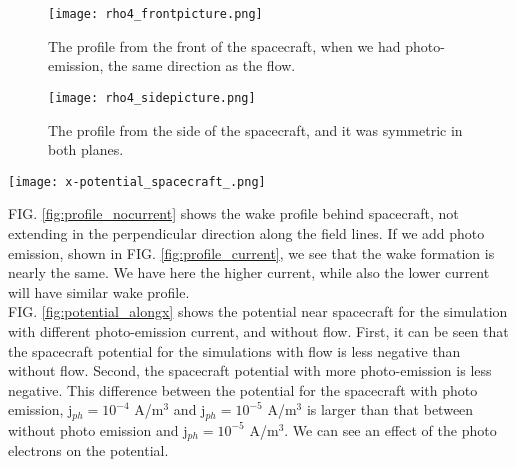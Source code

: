 \documentclass[aip, 
rsi, 
amsmath,
amssymb,
longbibliography,
reprint]{revtex4-1}
\begin{document}
\begin{figure*}
\begin{subfigure}{0.45\textwidth}\texttt{[image: rho4\_frontpicture.png]}
\caption{The profile from the front of the spacecraft, when we had photo-emission, the same direction as the flow.}
\end{subfigure}
\begin{subfigure}{0.45\textwidth}
\texttt{[image: rho4\_sidepicture.png]}
\caption{The profile from the side of the spacecraft, and it was symmetric in both planes.}
\end{subfigure}
\caption{The electron density(the phoe notation is used) distribution pictures: the situation when there is photo-emission of the j$_{ph} = 10^{-5}$ A/m$^3$ value. The wake is similar to the one in FIG. The gradient here is the density of electrons. \ref{fig:profile_nocurrent}. \label{fig:profile_current}}
\end{figure*}

\begin{figure*}
\texttt{[image: x-potential\_spacecraft\_.png]}
\caption{The potential along the flow direction for different photo emissions, emitting directly to the wake. Top line is the simulation with the photo-emission current set to $j_{ph} = 10^{-4}$ A/m$^3$, then to $10^{-5}$ A/m$^3$ and without photo emission. We also added the potential for the situation with no plasma flow, seen in the bottom.
\label{fig:potential_alongx}}
\end{figure*}

FIG. \ref{fig:profile_nocurrent} shows the wake profile behind spacecraft, not extending in the perpendicular direction along the field lines. If we add photo emission,  shown in FIG. \ref{fig:profile_current}, we see that the wake formation is nearly the same. We have here the higher current, while also the lower current will have similar wake profile.\\

FIG. \ref{fig:potential_alongx} shows the potential near spacecraft for the simulation with different photo-emission current, and without flow. First, it can be seen that the spacecraft potential for the simulations with flow is less negative than without flow. Second, the spacecraft potential with more photo-emission is less negative. This difference between the potential for the spacecraft  with photo emission, j$_{ph} = 10^{-4}$ A/m$^3$ and  j$_{ph} = 10^{-5}$ A/m$^3$ is larger than that between without photo emission and  j$_{ph} = 10^{-5}$ A/m$^3$. We can see an effect of the photo electrons on the potential.\\
\end{document}
